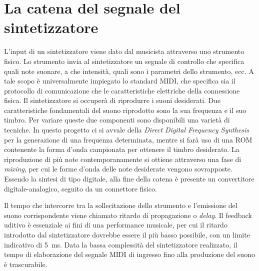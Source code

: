 \section{La catena del segnale del sintetizzatore}
L'input di un sintetizzatore viene dato dal musicista attraverso uno
strumento fisico. Lo strumento invia al sintetizzatore un segnale di
controllo che specifica quali note suonare, a che intensità, quali sono
i parametri dello strumento, ecc. A tale scopo è universalmente impiegato
lo standard MIDI, che specifica sia il protocollo di comunicazione che
le caratteristiche elettriche della connessione fisica.
Il sintetizzatore si occuperà di riprodurre i suoni desiderati. Due caratteristiche fondamentali del suono riprodotto sono la sua frequenza e il suo timbro. Per variare queste due componenti sono disponibili una varietà di tecniche.
In questo progetto ci si avvale della \textit{Direct Digital Frequency Synthesis} per la generazione di una frequenza determinata, mentre si farà uso di una ROM contenente la forma d'onda campionata per ottenere il timbro desiderato.
La riproduzione di più note contemporanamente si ottiene attraverso una fase di \textit{mixing}, per cui le forme d'onda delle note desiderate vengono sovrapposte.
Essendo la sintesi di tipo digitale, alla fine della catena è presente un convertitore digitale-analogico,
seguito da un connettore fisico.

Il tempo che intercorre tra la sollecitazione dello strumento e l'emissione del suono corrispondente viene chiamato ritardo di propagazione o \textit{delay}.
Il feedback uditivo è essenziale ai fini di una performance musicale, per cui il ritardo introdotto dal sintetizzatore
dovrebbe essere il più basso possibile, con un limite indicativo di \SI{5}{\milli\second}.
Data la bassa complessità del sintetizzatore realizzato, il tempo di elaborazione
del segnale MIDI di ingresso fino alla produzione del suono è trascurabile.


